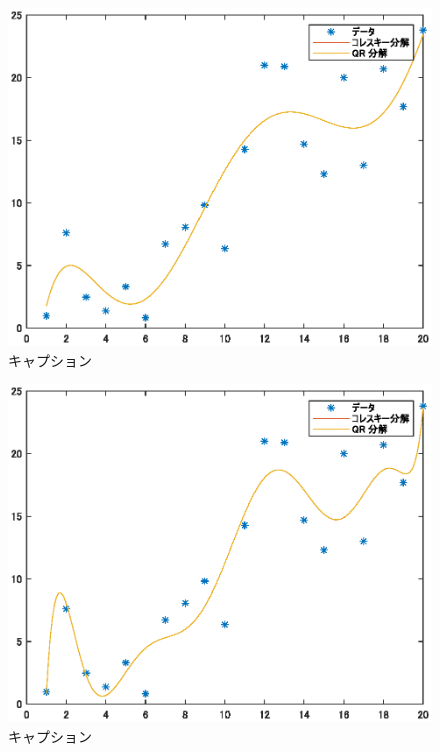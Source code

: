 \documentclass[titlepage, a4paper, 11pt, dvipdfmx]{jsarticle}
\begin{document}
\begin{figure}[H]
    \begin{center}%
      \includegraphics[width=13.5cm]{./graphics/saisyounijouhou/7.eps}
    \caption{キャプション}
    \label{Label}%
    \end{center}
  \end{figure}

  \begin{figure}[H]
    \begin{center}%
      \includegraphics[width=13.5cm]{./graphics/saisyounijouhou/9.eps}
    \caption{キャプション}
    \label{Label}%
    \end{center}
  \end{figure}
\end{document}
